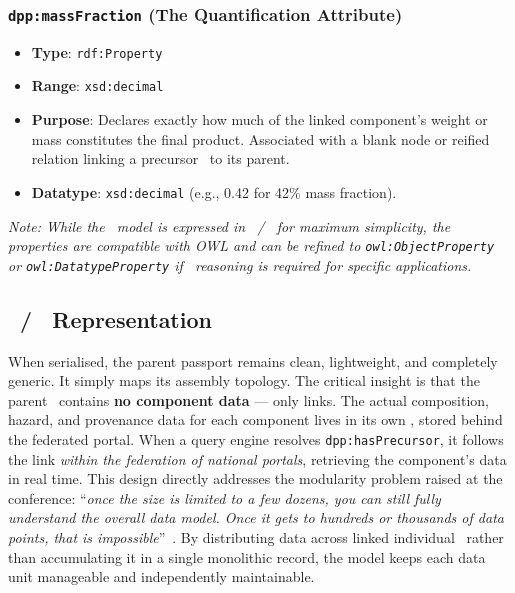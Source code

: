 \subsubsection{\texttt{dpp:massFraction} (The Quantification Attribute)}

\begin{itemize}
\item \textbf{Type}: \texttt{rdf:Property}
\item \textbf{Range}: \texttt{xsd:decimal}
\item \textbf{Purpose}: Declares exactly how much of the linked component's
weight or mass constitutes the final product. Associated with a blank node or
reified relation linking a precursor \DPP\ to its parent.
\item \textbf{Datatype}: \texttt{xsd:decimal} (e.g., 0.42 for 42\% mass
fraction).
\end{itemize}


\emph{Note: While the \DPP\ model is expressed in \RDF\ / \RDFS\ for maximum
simplicity, the properties are compatible with OWL and can be refined to
\texttt{owl:ObjectProperty} or \texttt{owl:DatatypeProperty} if \OWL\ reasoning
is required for specific applications.}

\subsection{\RDF\ / \JSONLD\ Representation}

When serialised, the parent passport remains clean, lightweight, and completely
generic. It simply maps its assembly topology. The critical insight is that the
parent \DPP\ contains \textbf{no component data} --- only links. The actual
composition, hazard, and provenance data for each component lives in its own
\DPP, stored behind the federated portal. When a query engine resolves
\texttt{dpp:hasPrecursor}, it follows the link \textit{within the federation of
national portals}, retrieving the component's data in real time. This design
directly addresses the modularity problem raised at the conference:
``\textit{once the size is limited to a few dozens, you can still fully
understand the overall data model. Once it gets to hundreds or thousands of data
points, that is impossible}''~\cite{dpp4eu2026_day1}. By distributing data
across linked individual \DPPs\ rather than accumulating it in a single
monolithic record, the model keeps each data unit manageable and independently
maintainable.

